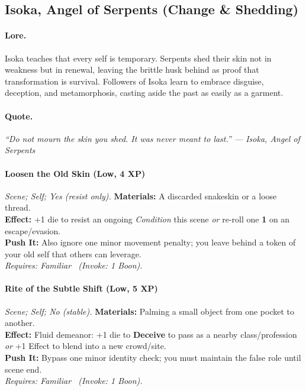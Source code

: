 \subsection{Isoka, Angel of Serpents (Change \& Shedding)}

\paragraph{Lore.} 
Isoka teaches that every self is temporary. Serpents shed their skin not in weakness but in renewal, leaving the brittle husk behind as proof that transformation is survival. Followers of Isoka learn to embrace disguise, deception, and metamorphosis, casting aside the past as easily as a garment.

\paragraph{Quote.}
\emph{“Do not mourn the skin you shed. It was never meant to last.” — Isoka, Angel of Serpents}

\paragraph{Loosen the Old Skin (Low, 4 XP)} \emph{Scene; Self; Yes (resist only).}
\textbf{Materials:} A discarded snakeskin or a loose thread. \\
\textbf{Effect:} +1 die to resist an ongoing \emph{Condition} this scene \emph{or} re-roll one \textbf{1} on an escape/evasion. \\
\textbf{Push It:} Also ignore one minor movement penalty; you leave behind a token of your old self that others can leverage. \\
\emph{Requires: Familiar \ (\textit{Invoke:} 1 Boon).}

\paragraph{Rite of the Subtle Shift (Low, 5 XP)} \emph{Scene; Self; No (stable).}
\textbf{Materials:} Palming a small object from one pocket to another. \\
\textbf{Effect:} Fluid demeanor: +1 die to \textbf{Deceive} to pass as a nearby class/profession \emph{or} +1 Effect to blend into a new crowd/site. \\
\textbf{Push It:} Bypass one minor identity check; you must maintain the false role until scene end. \\
\emph{Requires: Familiar \ (\textit{Invoke:} 1 Boon).}

